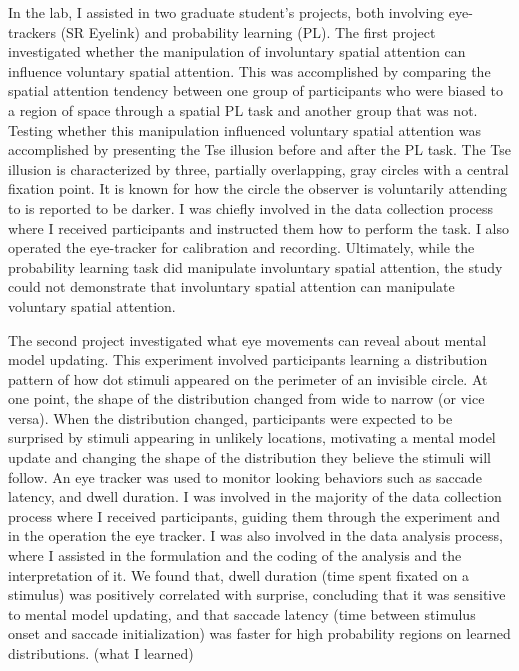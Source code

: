 In the lab, I assisted in two graduate student’s projects, both involving eye-trackers (SR Eyelink) and probability learning (PL). The first project investigated whether the manipulation of involuntary spatial attention can influence voluntary spatial attention. This was accomplished by comparing the spatial attention tendency between one group of participants who were biased to a region of space through a spatial PL task and another group that was not. Testing whether this manipulation influenced voluntary spatial attention was accomplished by presenting the Tse illusion before and after the PL task. The Tse illusion is characterized by three, partially overlapping, gray circles with a central fixation point. It is known for how the circle the observer is voluntarily attending to is reported to be darker. I was chiefly involved in the data collection process where I received participants and instructed them how to perform the task. I also operated the eye-tracker for calibration and recording. Ultimately, while the probability learning task did manipulate involuntary spatial attention, the study could not demonstrate that involuntary spatial attention can manipulate voluntary spatial attention.

The second project investigated what eye movements can reveal about mental model updating. This experiment involved participants learning a distribution pattern of how dot stimuli appeared on the perimeter of an invisible circle. At one point, the shape of the distribution changed from wide to narrow (or vice versa). When the distribution changed, participants were expected to be surprised by stimuli appearing in unlikely locations, motivating a mental model update and changing the shape of the distribution they believe the stimuli will follow. An eye tracker was used to monitor looking behaviors such as saccade latency, and dwell duration. I was involved in the majority of the data collection process where I received participants, guiding them through the experiment and in the operation the eye tracker. I was also involved in the data analysis process, where I assisted in the formulation and the coding of the analysis and the interpretation of it. We found that, dwell duration (time spent fixated on a stimulus) was positively correlated with surprise, concluding that it was sensitive to mental model updating, and that saccade latency (time between stimulus onset and saccade initialization) was faster for high probability regions on learned distributions. (what I learned)

